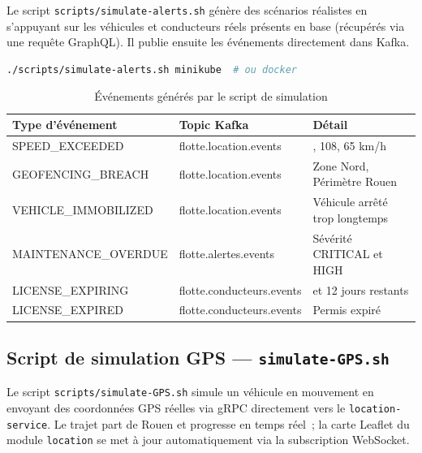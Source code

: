 \documentclass[12pt,a4paper]{article}
\begin{document}
Le script \texttt{scripts/simulate-alerts.sh} g\'{e}n\`{e}re des sc\'{e}narios r\'{e}alistes
en s'appuyant sur les v\'{e}hicules et conducteurs r\'{e}els pr\'{e}sents en base (r\'{e}cup\'{e}r\'{e}s
via une requ\^{e}te GraphQL). Il publie ensuite les \'{e}v\'{e}nements directement
dans Kafka.

\begin{lstlisting}[language=bash, caption=Lancement de la simulation]
./scripts/simulate-alerts.sh minikube  # ou docker
\end{lstlisting}

\begin{table}[H]
\centering
\small
\renewcommand{\arraystretch}{1.4}
\begin{tabular}{
  >{\raggedright\arraybackslash}p{4.4cm}
  >{\ttfamily\raggedright\arraybackslash}p{5.5cm}
  >{\raggedright\arraybackslash}p{3.2cm}
}
\toprule
\rowcolor{secondary}
\normalfont\textbf{Type d'\'{e}v\'{e}nement} & \normalfont\textbf{Topic Kafka} & \normalfont\textbf{D\'{e}tail} \\
\midrule
SPEED\_EXCEEDED        & flotte.location.events    & 138, 108, 65 km/h \\
\rowcolor{rowgray}
GEOFENCING\_BREACH     & flotte.location.events    & Zone Nord, P\'{e}rim\`{e}tre Rouen \\
VEHICLE\_IMMOBILIZED   & flotte.location.events    & V\'{e}hicule arr\^{e}t\'{e} trop longtemps \\
\rowcolor{rowgray}
MAINTENANCE\_OVERDUE   & flotte.alertes.events     & S\'{e}v\'{e}rit\'{e} CRITICAL et HIGH \\
LICENSE\_EXPIRING      & flotte.conducteurs.events & 5 et 12 jours restants \\
\rowcolor{rowgray}
LICENSE\_EXPIRED       & flotte.conducteurs.events & Permis expir\'{e} \\
\bottomrule
\end{tabular}
\caption{\'{E}v\'{e}nements g\'{e}n\'{e}r\'{e}s par le script de simulation}
\end{table}

\subsection{Script de simulation GPS --- \texttt{simulate-GPS.sh}}

Le script \texttt{scripts/simulate-GPS.sh} simule un v\'{e}hicule en mouvement
en envoyant des coordonn\'{e}es GPS r\'{e}elles via gRPC directement vers le
\texttt{location-service}. Le trajet part de Rouen et progresse en temps
r\'{e}el~; la carte Leaflet du module \texttt{location} se met \`{a} jour
automatiquement via la subscription WebSocket.
\end{document}
